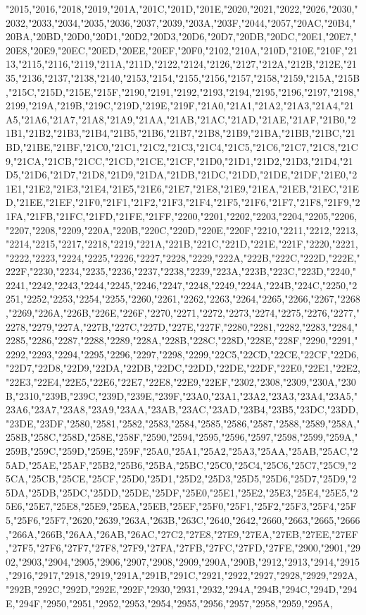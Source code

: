 "2015,"2016,"2018,"2019,"201A,"201C,"201D,"201E,"2020,"2021,"2022,"2026,"2030,"2032,"2033,"2034,"2035,"2036,"2037,"2039,"203A,"203F,"2044,"2057,"20AC,"20B4,"20BA,"20BD,"20D0,"20D1,"20D2,"20D3,"20D6,"20D7,"20DB,"20DC,"20E1,"20E7,"20E8,"20E9,"20EC,"20ED,"20EE,"20EF,"20F0,"2102,"210A,"210D,"210E,"210F,"2113,"2115,"2116,"2119,"211A,"211D,"2122,"2124,"2126,"2127,"212A,"212B,"212E,"2135,"2136,"2137,"2138,"2140,"2153,"2154,"2155,"2156,"2157,"2158,"2159,"215A,"215B,"215C,"215D,"215E,"215F,"2190,"2191,"2192,"2193,"2194,"2195,"2196,"2197,"2198,"2199,"219A,"219B,"219C,"219D,"219E,"219F,"21A0,"21A1,"21A2,"21A3,"21A4,"21A5,"21A6,"21A7,"21A8,"21A9,"21AA,"21AB,"21AC,"21AD,"21AE,"21AF,"21B0,"21B1,"21B2,"21B3,"21B4,"21B5,"21B6,"21B7,"21B8,"21B9,"21BA,"21BB,"21BC,"21BD,"21BE,"21BF,"21C0,"21C1,"21C2,"21C3,"21C4,"21C5,"21C6,"21C7,"21C8,"21C9,"21CA,"21CB,"21CC,"21CD,"21CE,"21CF,"21D0,"21D1,"21D2,"21D3,"21D4,"21D5,"21D6,"21D7,"21D8,"21D9,"21DA,"21DB,"21DC,"21DD,"21DE,"21DF,"21E0,"21E1,"21E2,"21E3,"21E4,"21E5,"21E6,"21E7,"21E8,"21E9,"21EA,"21EB,"21EC,"21ED,"21EE,"21EF,"21F0,"21F1,"21F2,"21F3,"21F4,"21F5,"21F6,"21F7,"21F8,"21F9,"21FA,"21FB,"21FC,"21FD,"21FE,"21FF,"2200,"2201,"2202,"2203,"2204,"2205,"2206,"2207,"2208,"2209,"220A,"220B,"220C,"220D,"220E,"220F,"2210,"2211,"2212,"2213,"2214,"2215,"2217,"2218,"2219,"221A,"221B,"221C,"221D,"221E,"221F,"2220,"2221,"2222,"2223,"2224,"2225,"2226,"2227,"2228,"2229,"222A,"222B,"222C,"222D,"222E,"222F,"2230,"2234,"2235,"2236,"2237,"2238,"2239,"223A,"223B,"223C,"223D,"2240,"2241,"2242,"2243,"2244,"2245,"2246,"2247,"2248,"2249,"224A,"224B,"224C,"2250,"2251,"2252,"2253,"2254,"2255,"2260,"2261,"2262,"2263,"2264,"2265,"2266,"2267,"2268,"2269,"226A,"226B,"226E,"226F,"2270,"2271,"2272,"2273,"2274,"2275,"2276,"2277,"2278,"2279,"227A,"227B,"227C,"227D,"227E,"227F,"2280,"2281,"2282,"2283,"2284,"2285,"2286,"2287,"2288,"2289,"228A,"228B,"228C,"228D,"228E,"228F,"2290,"2291,"2292,"2293,"2294,"2295,"2296,"2297,"2298,"2299,"22C5,"22CD,"22CE,"22CF,"22D6,"22D7,"22D8,"22D9,"22DA,"22DB,"22DC,"22DD,"22DE,"22DF,"22E0,"22E1,"22E2,"22E3,"22E4,"22E5,"22E6,"22E7,"22E8,"22E9,"22EF,"2302,"2308,"2309,"230A,"230B,"2310,"239B,"239C,"239D,"239E,"239F,"23A0,"23A1,"23A2,"23A3,"23A4,"23A5,"23A6,"23A7,"23A8,"23A9,"23AA,"23AB,"23AC,"23AD,"23B4,"23B5,"23DC,"23DD,"23DE,"23DF,"2580,"2581,"2582,"2583,"2584,"2585,"2586,"2587,"2588,"2589,"258A,"258B,"258C,"258D,"258E,"258F,"2590,"2594,"2595,"2596,"2597,"2598,"2599,"259A,"259B,"259C,"259D,"259E,"259F,"25A0,"25A1,"25A2,"25A3,"25AA,"25AB,"25AC,"25AD,"25AE,"25AF,"25B2,"25B6,"25BA,"25BC,"25C0,"25C4,"25C6,"25C7,"25C9,"25CA,"25CB,"25CE,"25CF,"25D0,"25D1,"25D2,"25D3,"25D5,"25D6,"25D7,"25D9,"25DA,"25DB,"25DC,"25DD,"25DE,"25DF,"25E0,"25E1,"25E2,"25E3,"25E4,"25E5,"25E6,"25E7,"25E8,"25E9,"25EA,"25EB,"25EF,"25F0,"25F1,"25F2,"25F3,"25F4,"25F5,"25F6,"25F7,"2620,"2639,"263A,"263B,"263C,"2640,"2642,"2660,"2663,"2665,"2666,"266A,"266B,"26AA,"26AB,"26AC,"27C2,"27E8,"27E9,"27EA,"27EB,"27EE,"27EF,"27F5,"27F6,"27F7,"27F8,"27F9,"27FA,"27FB,"27FC,"27FD,"27FE,"2900,"2901,"2902,"2903,"2904,"2905,"2906,"2907,"2908,"2909,"290A,"290B,"2912,"2913,"2914,"2915,"2916,"2917,"2918,"2919,"291A,"291B,"291C,"2921,"2922,"2927,"2928,"2929,"292A,"292B,"292C,"292D,"292E,"292F,"2930,"2931,"2932,"294A,"294B,"294C,"294D,"294E,"294F,"2950,"2951,"2952,"2953,"2954,"2955,"2956,"2957,"2958,"2959,"295A,